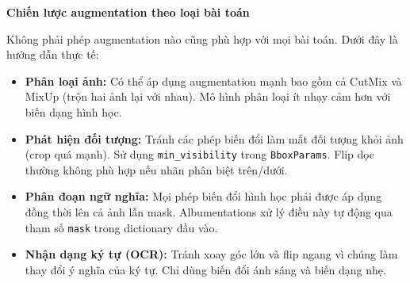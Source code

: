 \begin{mdframed}[style=infobox]
    \textbf{Chiến lược augmentation theo loại bài toán}

    Không phải phép augmentation nào cũng phù hợp với mọi bài toán. Dưới đây là hướng dẫn thực tế:

    \begin{itemize}
        \item \textbf{Phân loại ảnh:} Có thể áp dụng augmentation mạnh bao gồm cả CutMix và MixUp (trộn hai ảnh lại với nhau). Mô hình phân loại ít nhạy cảm hơn với biến dạng hình học.

        \item \textbf{Phát hiện đối tượng:} Tránh các phép biến đổi làm mất đối tượng khỏi ảnh (crop quá mạnh). Sử dụng \texttt{min\_visibility} trong \texttt{BboxParams}. Flip dọc thường không phù hợp nếu nhãn phân biệt trên/dưới.

        \item \textbf{Phân đoạn ngữ nghĩa:} Mọi phép biến đổi hình học phải được áp dụng đồng thời lên cả ảnh lẫn mask. Albumentations xử lý điều này tự động qua tham số \texttt{mask} trong dictionary đầu vào.

        \item \textbf{Nhận dạng ký tự (OCR):} Tránh xoay góc lớn và flip ngang vì chúng làm thay đổi ý nghĩa của ký tự. Chỉ dùng biến đổi ánh sáng và biến dạng nhẹ.
    \end{itemize}
\end{mdframed}
